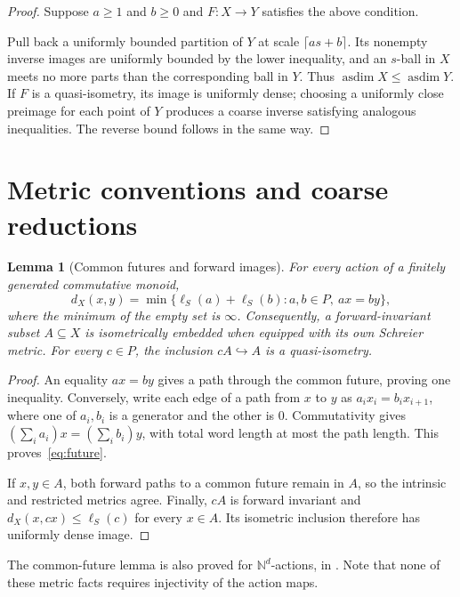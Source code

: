 \documentclass[11pt,letterpaper]{article}
\newtheorem{lemma}[theorem]{Lemma}
\theoremstyle{definition}
\DeclareMathOperator{\asdim}{asdim}
\newcommand{\NN}{\mathbb N}
\begin{document}
\begin{proof}
Suppose $a\ge1$ and $b\ge0$ and $F:X\to Y$ satisfies the above condition.

Pull back a uniformly bounded partition of $Y$ at scale
$\lceil as+b\rceil$. Its nonempty inverse images are uniformly bounded
by the lower inequality, and an $s$-ball in $X$ meets no more parts than
the corresponding ball in $Y$. Thus $\asdim X\le\asdim Y$. If $F$ is a
quasi-isometry, its image is uniformly dense; choosing a uniformly close
preimage for each point of $Y$ produces a coarse inverse satisfying
analogous inequalities. The reverse bound follows in the same way.
\end{proof}

\section{Metric conventions and coarse reductions}\label{sec:metric}

\begin{lemma}[Common futures and forward images]\label{lem:future}
For every action of a finitely generated commutative monoid,
\begin{equation}\label{eq:future}
 d_X(x,y)=\min\{\ell_S(a)+\ell_S(b):a,b\in P,\ ax=by\},
\end{equation}
where the minimum of the empty set is $\infty$. Consequently, a
forward-invariant subset $A\subseteq X$ is isometrically embedded when
equipped with its own Schreier metric. For every $c\in P$, the inclusion
$cA\hookrightarrow A$ is a quasi-isometry.
\end{lemma}

\begin{proof}
An equality $ax=by$ gives a path through the common future, proving one
inequality. Conversely, write each edge of a path from $x$ to $y$ as
$a_i x_i=b_i x_{i+1}$, where one of $a_i,b_i$ is a generator and the other
is $0$. Commutativity gives
$(\sum_i a_i)x=(\sum_i b_i)y$, with total word length at most the path
length. This proves~\eqref{eq:future}.

If $x,y\in A$, both forward paths to a common future remain in $A$, so the
intrinsic and restricted metrics agree. Finally, $cA$ is forward invariant
and $d_X(x,cx)\le\ell_S(c)$ for every $x\in A$. Its isometric inclusion
therefore has uniformly dense image.
\end{proof}

The common-future lemma is also proved for $\NN^d$-actions, in \cite[Lemmas~4.1--4.2]{Wang}. Note that none of these metric facts
requires injectivity of the action maps.
\end{document}
